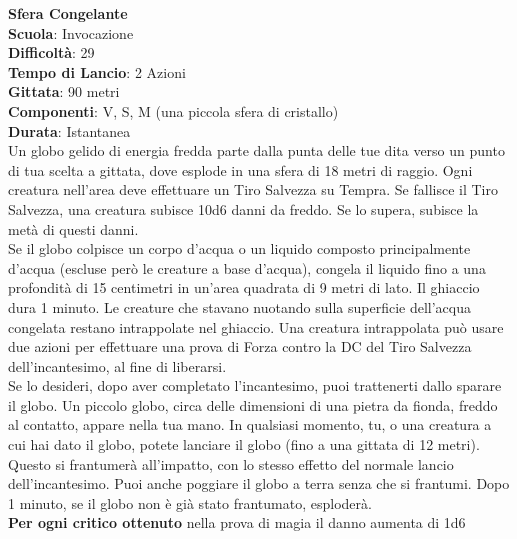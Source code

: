 \begin{multicols}{2}
\medskip\textbf{Sfera Congelante}\\
\textbf{Scuola}: Invocazione\\
\textbf{Difficoltà}: 29\\
\textbf{Tempo di Lancio}: 2 Azioni\\
\textbf{Gittata}: 90 metri\\
\textbf{Componenti}: V, S, M (una piccola sfera di cristallo)\\
\textbf{Durata}: Istantanea\\
Un globo gelido di energia fredda parte dalla punta delle tue dita verso un punto di tua scelta a gittata, dove esplode in una sfera di 18 metri di raggio. Ogni creatura nell'area deve effettuare un Tiro Salvezza su Tempra. Se fallisce il Tiro Salvezza, una creatura subisce 10d6 danni da freddo. Se lo supera, subisce la metà di questi danni.\\
Se il globo colpisce un corpo d'acqua o un liquido composto principalmente d'acqua (escluse però le creature a base d'acqua), congela il liquido fino a una profondità di 15 centimetri in un'area quadrata di 9 metri di lato. Il ghiaccio dura 1 minuto. Le creature che stavano nuotando sulla superficie dell'acqua congelata restano intrappolate nel ghiaccio. Una creatura intrappolata può usare due azioni per effettuare una prova di Forza contro la DC del Tiro Salvezza dell'incantesimo, al fine di liberarsi.\\
Se lo desideri, dopo aver completato l'incantesimo, puoi trattenerti dallo sparare il globo. Un piccolo globo, circa delle dimensioni di una pietra da fionda, freddo al contatto, appare nella tua mano. In qualsiasi momento, tu, o una creatura a cui hai dato il globo, potete lanciare il globo (fino a una gittata di 12 metri). Questo si frantumerà all'impatto, con lo stesso effetto del normale lancio dell'incantesimo. Puoi anche poggiare il globo a terra senza che si frantumi. Dopo 1 minuto, se il globo non è già stato frantumato, esploderà.\\
\textbf{Per ogni critico ottenuto} nella prova di magia il danno aumenta di 1d6


\end{multicols}
